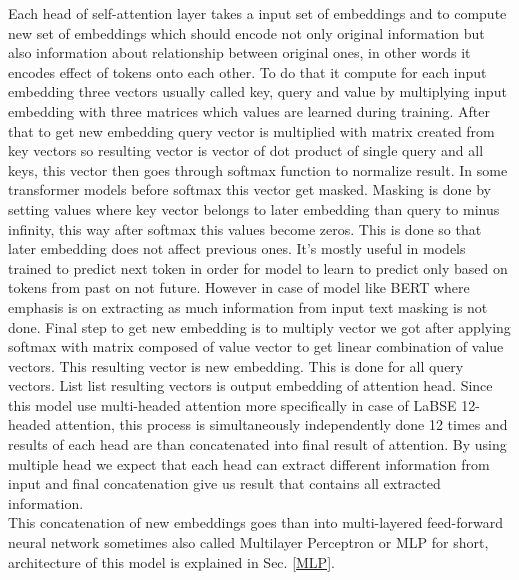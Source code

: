 Each head of self-attention layer takes a input set of embeddings and to compute new set of embeddings which should encode not only original information but also information about relationship between original ones, in other words it encodes effect of tokens onto each other. To do that it compute for each input embedding three vectors usually called key, query and value by multiplying input embedding with three matrices which values are learned during training. After that to get new embedding query vector is multiplied with matrix created from key vectors so resulting vector is vector of dot product of single query and all keys, this vector then goes through softmax function to normalize result. In some transformer models before softmax this vector get masked. Masking is done by setting values where key vector belongs to later embedding than query to minus infinity, this way after softmax this values become zeros. This is done so that later embedding does not affect previous ones. It's mostly useful in models trained to predict next token in order for model to learn to predict only based on tokens from past on not future. However in case of model like BERT where emphasis is on extracting as much information from input text masking is not done. Final step to get new embedding is to multiply vector we got after applying softmax with matrix composed of value vector to get linear combination of value vectors. This resulting vector is new embedding. This is done for all query vectors. List list resulting vectors is output embedding of attention head. Since this model use multi-headed attention more specifically in case of LaBSE 12-headed attention, this process is simultaneously independently done 12 times and results of each head are than concatenated into final result of attention. By using multiple head we expect that each head can extract different information from input and final concatenation give us result that contains all extracted information.    
\\

This concatenation of new embeddings goes than into multi-layered feed-forward neural network sometimes also called Multilayer Perceptron or MLP for short, architecture of this model is explained in Sec. \ref{MLP}.
\\

